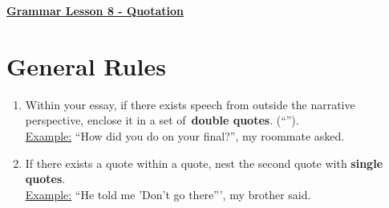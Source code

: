 \documentclass[12pt]{article} %
\begin{document}
	\renewcommand*{\coursecode}{MATH 235} %
	\renewcommand*{\assgnnumber}{Assignment 1} %
	\renewcommand*{\submdate}{September 14, 2021} %
	\renewcommand*{\studentfname}{Abdullah} %
	\renewcommand*{\studentlname}{Zubair} %
    \renewcommand*{\proofname}{Proof:}

	\renewcommand\qedsymbol{$\blacksquare$}
	\setfigpath
	\fancyhfoffset[L,O]{0pt} %





\begin{center}
  \textbf{\underline{\Huge{Grammar Lesson 8 - Quotation}}}
\end{center}

\section*{General Rules}
\begin{enumerate}
  \item Within your essay, if there exists speech from outside the narrative perspective, enclose it in a set of\
  \textbf{double quotes}. (``'').\\
  \underline{Example:} ``How did you do on your final?'', my roommate asked.

  \item If there exists a quote within a quote, nest the second quote with \textbf{single quotes}. \\
  \underline{Example:} ``He told me 'Don't go there''', my brother said.
\end{enumerate}
\end{document}
